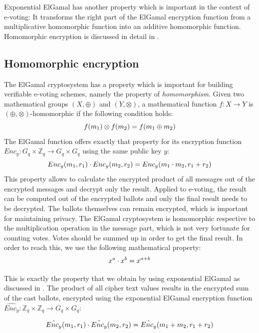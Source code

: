 \documentclass[numbers=noenddot, abstract=on, a4paper, headsepline,
footsepline, oneside, openright, draft=off, listof=leveldown]{scrreprt}
\begin{document}
Exponential ElGamal has another property which is important in the context of
e-voting: It transforms the right part of the ElGamal encryption function from a
multiplicative homomorphic function into an additive homomorphic function.
Homomorphic encryption is discussed in detail in .

\subsection{Homomorphic encryption}
\label{sec:homenc}
The ElGamal cryptosystem has a property
which is important for building verifiable e-voting schemes, namely the property
of \emph{homomorphism}. Given two mathematical groups $(X,\oplus)$ and
$(Y,\otimes)$, a mathematical function $f:X \rightarrow Y$ is $(\oplus, \otimes)$-homomorphic if
the following condition holds:
\begin{equation}
f(m_1) \otimes f(m_2) = f(m_1 \oplus m_2) \notag
\end{equation}
The ElGamal function offers exactly that property for its encryption function
$Enc_y:G_q \times \mathbb{Z}_q \rightarrow G_q \times G_q$ using the same public key $y$:
\begin{equation}
Enc_y(m_1, r_1) \cdot Enc_y(m_2, r_2) = Enc_y(m_1 \cdot m_2, r_1 + r_2)
\notag
\end{equation}
This property allows to calculate the encrypted product of all messages out of
the encrypted messages and decrypt only the result. Applied to e-voting, the
result can be computed out of the encrypted ballots and only the final result
needs to be decrypted. The ballots themselves can remain encrypted, which is
important for maintaining privacy. The ElGamal cryptosystem is homomorphic
respective to the multiplication operation in the message part, which is not
very fortunate for counting votes. Votes should be summed up in order to get the
final result. In order to reach this, we use the following mathematical property:
\begin{equation}
x^a \cdot x^b = x^{a+b} \notag
\end{equation}

This is exactly the property that we obtain by using exponential ElGamal as
discussed in . The product of all cipher text
values results in the encrypted sum of the cast ballots, encrypted using the
exponential ElGamal encryption function $\hat{Enc_y}:\mathbb{Z}_q \times
\mathbb{Z}_q \rightarrow G_q \times G_q$:

\begin{equation}
\hat{Enc_y}(m_1, r_1) \cdot \hat{Enc_y}(m_2, r_2) = \hat{Enc_y}(m_1 + m_2, r_1 +
r_2)
\notag
\end{equation}
\end{document}
